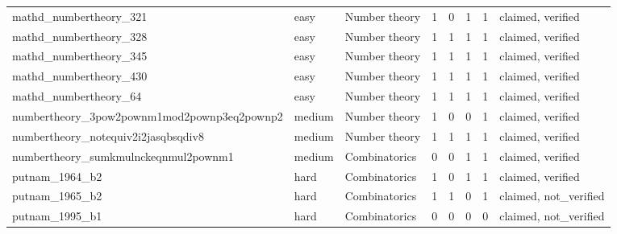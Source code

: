 \begin{table}[t]
\begin{tabular}{lllccccl}
mathd\_numbertheory\_321 & easy & Number theory & 1 & 0 & 1 & 1 & claimed, verified \\
mathd\_numbertheory\_328 & easy & Number theory & 1 & 1 & 1 & 1 & claimed, verified \\
mathd\_numbertheory\_345 & easy & Number theory & 1 & 1 & 1 & 1 & claimed, verified \\
mathd\_numbertheory\_430 & easy & Number theory & 1 & 1 & 1 & 1 & claimed, verified \\
mathd\_numbertheory\_64 & easy & Number theory & 1 & 1 & 1 & 1 & claimed, verified \\
numbertheory\_3pow2pownm1mod2pownp3eq2pownp2 & medium & Number theory & 1 & 0 & 0 & 1 & claimed, verified \\
numbertheory\_notequiv2i2jasqbsqdiv8 & medium & Number theory & 1 & 1 & 1 & 1 & claimed, verified \\
numbertheory\_sumkmulnckeqnmul2pownm1 & medium & Combinatorics & 0 & 0 & 1 & 1 & claimed, verified \\
putnam\_1964\_b2 & hard & Combinatorics & 1 & 0 & 1 & 1 & claimed, verified \\
putnam\_1965\_b2 & hard & Combinatorics & 1 & 1 & 0 & 1 & claimed, not\_verified \\
putnam\_1995\_b1 & hard & Combinatorics & 0 & 0 & 0 & 0 & claimed, not\_verified \\
\bottomrule
\end{tabular}
\end{table}


